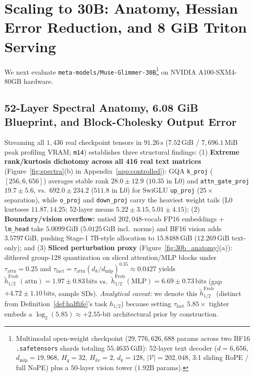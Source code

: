 \documentclass[10pt]{article} %
\begin{document}
\section{Scaling to 30B: Anatomy, Hessian Error Reduction, and 8 GiB Triton Serving}
\label{sec:30b_scale}

We next evaluate \texttt{meta-models/Muse-Glimmer-30B}\footnote{Multimodal open-weight checkpoint ($29{,}776{,}626{,}688$ params across two BF16 \texttt{.safetensors} shards totaling $55.4635\,\text{GiB}$): 52-layer text decoder ($d=6{,}656$, $d_{\text{mlp}}=19{,}968$, $H_q=32$, $H_{kv}=2$, $d_k=128$, $|\mathcal{V}|=202{,}048$, 3:1 sliding RoPE / full NoPE) plus a 50-layer vision tower ($1.92\text{B}$ params).} on NVIDIA A100-SXM4-80GB hardware.

\subsection{52-Layer Spectral Anatomy, 6.08 GiB Blueprint, and Block-Cholesky Output Error}
\label{sec:30b_anatomy}

Streaming all $1{,}436$ real checkpoint tensors in $91.26\,\text{s}$ ($7.52\,\text{GiB}$ / $7{,}696.1\,\text{MiB}$ peak profiling VRAM; \texttt{m14}) establishes three structural findings: (1) \textbf{Extreme rank/kurtosis dichotomy across all 416 real text matrices} (Figure~\ref{fig:spectra}(b) in Appendix~\ref{app:controlled}): GQA \texttt{k\_proj} ($[256, 6{,}656]$) averages stable rank $28.0 \pm 12.9$ ($10.35$ in L0) and \texttt{attn\_gate\_proj} $19.7 \pm 5.6$, vs.\ $692.0 \pm 234.2$ ($511.8$ in L0) for SwiGLU \texttt{up\_proj} ($25\times$ separation), while \texttt{o\_proj} and \texttt{down\_proj} carry the heaviest weight tails (L0 kurtoses $11.87, 14.25$; 52-layer means $5.22 \pm 3.15, 5.01 \pm 4.15$); (2) \textbf{Boundary/vision overflow:} untied $202{,}048$-vocab FP16 embeddings + \texttt{lm\_head} take $5.0099\,\text{GiB}$ ($5.0125\,\text{GiB}$ incl.\ norms) and BF16 vision adds $3.5797\,\text{GiB}$, pushing Stage-1 7B-style allocation to \textbf{$15.8488\,\text{GiB}$} ($12.269\,\text{GiB}$ text-only); and (3) \textbf{Sliced perturbation proxy} (Figure~\ref{fig:30b_anatomy}(a)): dithered group-128 quantization on sliced attention/MLP blocks under $\tau_{\text{attn}}=0.25$ and $\tau_{\text{fact}} = \tau_{\text{attn}}(d_k/d_{\text{mlp}})^{0.35} \approx 0.0427$ yields $\tilde{h}_{1/2}^{\text{Frob}}(\text{attn}) = 1.97 \pm 0.83\,\text{bits}$ vs.\ $\tilde{h}_{1/2}^{\text{Frob}}(\text{MLP}) = 6.69 \pm 0.73\,\text{bits}$ (gap $+4.72 \pm 1.10\,\text{bits}$, sample SDs). \emph{Analytical caveat:} we denote this $\tilde{h}_{1/2}^{\text{Frob}}$ (distinct from Definition~\ref{def:halflife}'s task $h_{1/2}$) because setting $\tau_{\text{fact}}$ $5.85\times$ tighter embeds a $\log_2(5.85) \approx +2.55$-bit architectural prior by construction.
\end{document}
